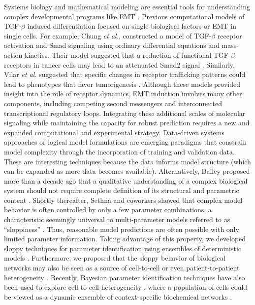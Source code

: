 \documentclass[12pt]{article}
\begin{document}
Systems biology and mathematical modeling are essential tools for understanding complex developmental programs like EMT \citep{Ahmed:2007mi}.
Previous computational models of TGF-$\beta$ induced differentiation focused on single biological factors or EMT in single cells.
For example, Chung \emph{et al.}, constructed a model of TGF-$\beta$ receptor activation and Smad signaling using ordinary differential equations and mass-action kinetics.
Their model suggested that a reduction of functional TGF-$\beta$ receptors in cancer cells may lead to an attenuated Smad2 signal \citep{Chung:2009jl}.
Similarly, Vilar \emph{et al.} suggested that specific changes in receptor trafficking patterns could lead to phenotypes that favor tumorigenesis \citep{Vilar:2006gb}.
Although these models provided insight into the role of receptor dynamics, EMT induction involves many other components, including competing second messengers and interconnected transcriptional regulatory loops.
Integrating these additional scales of molecular signaling while maintaining the capacity for robust prediction requires a new and expanded computational and experimental strategy.
Data-driven systems approaches \citep{Cirit:2012kx} or logical model formulations \citep{Morris:2011ys} are emerging paradigms that constrain model complexity through the incorporation of training and validation data.
These are interesting techniques because the data informs model structure (which can be expanded as more data becomes available).
Alternatively, Bailey proposed more than a decade ago that a qualitative understanding of a complex biological system should not require complete definition of its structural and parametric content \citep{2001_bailey_NatBiotech}.
Shortly thereafter, Sethna and coworkers showed that complex model behavior is often controlled by only a few parameter combinations, a characteristic seemingly universal to multi-parameter models referred to as ``sloppiness'' \citep{Machta:2013by}.
Thus, reasonable model predictions are often possible with only limited parameter information.
Taking advantage of this property, we developed sloppy techniques for parameter identification using ensembles of deterministic models \citep{Song:2010fk}.
Furthermore, we proposed that the sloppy behavior of biological networks may also be seen as a source of cell-to-cell \citep{Lequieu:2011fj} or even patient-to-patient heterogeneity \citep{2010_luan_varner_MolBioSys}.
Recently, Bayesian parameter identification techniques have also been used to explore cell-to-cell heterogeneity  \citep{2011_kalita_brasier_JBC,2011_hasenauer_allgower_BMCBioinfo},
where a population of cells could be viewed as a dynamic ensemble of context-specific biochemical networks \citep{2012_creixell_linding_NatBiotech}.
\end{document}
